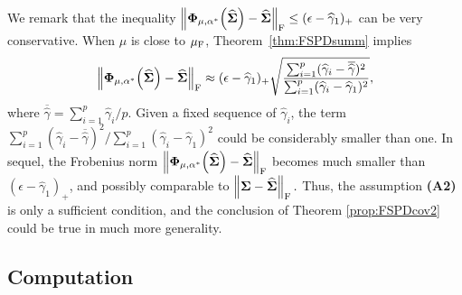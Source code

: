 \documentclass[times,sort&compress,3p]{elsarticle}
\begin{document}
We remark that the inequality $\left\| {\bf \Phi}_{\mu, \alpha^*}\Big(\widehat{\bf \Sigma}\Big) - \widehat{{\bf \Sigma}} \right\|_{\rm F} \leq (\epsilon - {\widehat{\gamma}}_1)_+ $ can be very conservative. When $\mu$ is close to $\mu_{\rm F}$, 
Theorem~\ref{thm:FSPDsumm} implies 
\[
\left\| {\bf \Phi}_{\mu, \alpha^*}\Big(\widehat{\bf \Sigma}\Big) - \widehat{{\bf \Sigma}} \right\|_{\rm F} \approx (\epsilon - {\widehat{\gamma}}_1)_+  \sqrt{\frac{\sum_{i=1}^p ({\widehat{\gamma}}_i - {\overline{\widehat{\gamma}}})^2}{\sum_{i=1}^p ({\widehat{\gamma}}_i - {\widehat{\gamma}}_1)^2} },
\] 
where $\overline{\widehat{\gamma}}=\sum_{i=1}^p \widehat{\gamma}_i \big/p$. Given a fixed sequence of ${\widehat{\gamma}}_i$,  the term ${\sum_{i=1}^p ({\widehat{\gamma}}_i - {\overline{\widehat{\gamma}}})^2}\big/{\sum_{i=1}^p ({\widehat{\gamma}}_i - {\widehat{\gamma}}_1)^2}$ 
could be considerably smaller than one. In sequel, the Frobenius norm $\left\| {\bf \Phi}_{\mu, \alpha^*}\Big(\widehat{\bf \Sigma}\Big) - {\widehat{\bf \Sigma}} \right\|_{\rm F}$ becomes much smaller than $(\epsilon - {\widehat{\gamma}}_1)_+$, 
and possibly comparable to $\left\| {\bf \Sigma} - {\widehat{\bf \Sigma}} \right\|_{\rm F}.$  Thus, the assumption
{\bf (A2)} is only a sufficient condition, and the conclusion of Theorem \ref{prop:FSPDcov2} could be true in much 
more generality. 




\subsection{Computation}\label{subsec:computation}
\end{document}
